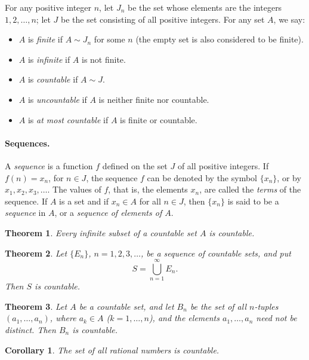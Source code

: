 \documentclass{article}
\newtheorem{theorem}{Theorem}
\numberwithin{theorem}{section}
\newtheorem*{corollary*}{Corollary}
\begin{document}
For any positive integer $n$, let $J_n$ be the set whose elements are the
integers $1, 2, \ldots, n$; let $J$ be the set consisting of all positive
integers. For any set $A$, we say:
\begin{itemize}[(a)]
  \item $A$ is \emph{finite} if $A \sim J_n$ for some $n$ (the empty set is also
    considered to be finite).
  \item $A$ is \emph{infinite} if $A$ is not finite.
  \item $A$ is \emph{countable} if $A \sim J$.
  \item $A$ is \emph{uncountable} if $A$ is neither finite nor countable.
  \item $A$ is \emph{at most countable} if $A$ is finite or countable.
\end{itemize}

\paragraph{Sequences.} A \emph{sequence} is a function $f$ defined on the set
$J$ of all positive integers. If $f(n) = x_n$, for $n \in J$, the sequence $f$
can be denoted by the symbol $\{x_n\}$, or by $x_1, x_2, x_3, \ldots$. The
values of $f$, that is, the elements $x_n$, are called the \emph{terms} of the
sequence. If $A$ is a set and if $x_n \in A$ for all $n \in J$, then $\{x_n\}$
is said to be a \emph{sequence} in $A$, or a \emph{sequence of elements of $A$}.

\setcounter{theorem}{7}
\begin{theorem}
  Every infinite subset of a countable set $A$ is countable.
\end{theorem}

\setcounter{theorem}{11}
\begin{theorem}
  Let $\{E_n\}$, $n = 1, 2, 3, \ldots$, be a sequence of countable sets, and put
  \[
    S = \bigcup_{n=1}^{\infty} E_n.
  \] Then $S$ is countable.
\end{theorem}

\begin{theorem}
  Let $A$ be a countable set, and let $B_n$ be the set of all $n$-tuples $(a_1,
  \ldots, a_n)$, where $a_k \in A$ ($k = 1, \ldots, n$), and the elements $a_1,
  \ldots, a_n$ need not be distinct. Then $B_n$ is countable.
\end{theorem}

\begin{corollary*}
  The set of all rational numbers is countable.
\end{corollary*}
\end{document}
